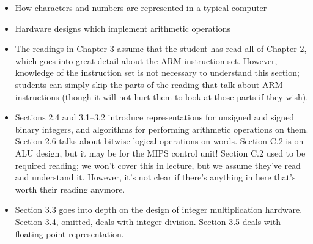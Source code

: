 




% 




\setlength{\columnseprule}{1pt}
\def\columnseprulecolor{\color{blue}}

\begin{frame}[fragile]
\begin{itemize}
\item How characters and numbers are represented in a typical computer
\item Hardware designs which implement arithmetic operations
\end{itemize}
\BNotes\ifnum{}
\begin{itemize}
\item The readings in Chapter 3 assume that the student has read all of
Chapter 2, which goes into great detail about the ARM instruction
set. However, knowledge of the instruction set is not necessary to
understand this section; students can simply skip the parts of the
reading that talk about ARM instructions (though it will not hurt
them to look at those parts if they wish). 

\item
Sections 2.4 and 3.1--3.2
introduce representations for unsigned and signed binary integers, and
algorithms for performing arithmetic operations on them. Section 2.6
talks about bitwise logical operations on words. Section C.2 is on ALU
design, but it may be for the MIPS control unit!  Section C.2 used to
be required reading; we won't cover this in
lecture, but we assume they've read and understand it.  However, it's not
clear if there's anything in here that's worth their reading anymore.

\item
Section 3.3 goes into depth on the design of integer multiplication
hardware. Section 3.4, omitted, deals with integer
division. Section 3.5 deals with floating-point representation.
\end{itemize}
\fi\ENotes
\end{frame}


